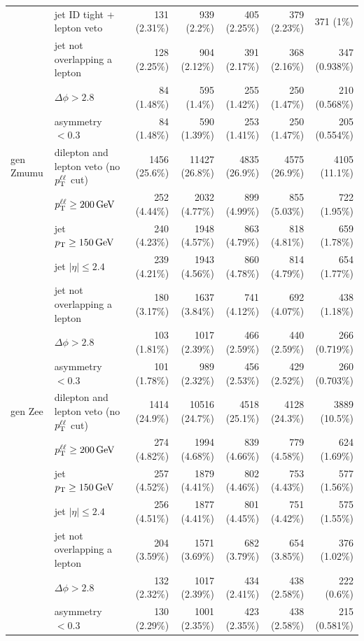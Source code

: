 \begin{tabular}{llrrrrr}
 & jet ID tight + lepton veto & 131 (2.31\%) & 939 (2.2\%) & 405 (2.25\%) & 379 (2.23\%) & 371 (1\%) \\
 & jet not overlapping a lepton & 128 (2.25\%) & 904 (2.12\%) & 391 (2.17\%) & 368 (2.16\%) & 347 (0.938\%) \\
 & $\Delta\phi > 2.8$ & 84 (1.48\%) & 595 (1.4\%) & 255 (1.42\%) & 250 (1.47\%) & 210 (0.568\%) \\
 & asymmetry $< 0.3$ & 84 (1.48\%) & 590 (1.39\%) & 253 (1.41\%) & 250 (1.47\%) & 205 (0.554\%) \\
\midrule
gen Zmumu & dilepton and lepton veto (no $p_{\mathrm{T}}^{\ell\ell}$ cut) & 1456 (25.6\%) & 11427 (26.8\%) & 4835 (26.9\%) & 4575 (26.9\%) & 4105 (11.1\%) \\
 & $p_{\mathrm{T}}^{\ell\ell} \geq 200\,\mathrm{GeV}$ & 252 (4.44\%) & 2032 (4.77\%) & 899 (4.99\%) & 855 (5.03\%) & 722 (1.95\%) \\
 & jet $p_{\mathrm{T}} \geq 150\,\mathrm{GeV}$ & 240 (4.23\%) & 1948 (4.57\%) & 863 (4.79\%) & 818 (4.81\%) & 659 (1.78\%) \\
 & jet $|\eta| \leq 2.4$ & 239 (4.21\%) & 1943 (4.56\%) & 860 (4.78\%) & 814 (4.79\%) & 654 (1.77\%) \\
 & jet not overlapping a lepton & 180 (3.17\%) & 1637 (3.84\%) & 741 (4.12\%) & 692 (4.07\%) & 438 (1.18\%) \\
 & $\Delta\phi > 2.8$ & 103 (1.81\%) & 1017 (2.39\%) & 466 (2.59\%) & 440 (2.59\%) & 266 (0.719\%) \\
 & asymmetry $< 0.3$ & 101 (1.78\%) & 989 (2.32\%) & 456 (2.53\%) & 429 (2.52\%) & 260 (0.703\%) \\
\midrule
gen Zee & dilepton and lepton veto (no $p_{\mathrm{T}}^{\ell\ell}$ cut) & 1414 (24.9\%) & 10516 (24.7\%) & 4518 (25.1\%) & 4128 (24.3\%) & 3889 (10.5\%) \\
 & $p_{\mathrm{T}}^{\ell\ell} \geq 200\,\mathrm{GeV}$ & 274 (4.82\%) & 1994 (4.68\%) & 839 (4.66\%) & 779 (4.58\%) & 624 (1.69\%) \\
 & jet $p_{\mathrm{T}} \geq 150\,\mathrm{GeV}$ & 257 (4.52\%) & 1879 (4.41\%) & 802 (4.46\%) & 753 (4.43\%) & 577 (1.56\%) \\
 & jet $|\eta| \leq 2.4$ & 256 (4.51\%) & 1877 (4.41\%) & 801 (4.45\%) & 751 (4.42\%) & 575 (1.55\%) \\
 & jet not overlapping a lepton & 204 (3.59\%) & 1571 (3.69\%) & 682 (3.79\%) & 654 (3.85\%) & 376 (1.02\%) \\
 & $\Delta\phi > 2.8$ & 132 (2.32\%) & 1017 (2.39\%) & 434 (2.41\%) & 438 (2.58\%) & 222 (0.6\%) \\
 & asymmetry $< 0.3$ & 130 (2.29\%) & 1001 (2.35\%) & 423 (2.35\%) & 438 (2.58\%) & 215 (0.581\%) \\

\end{tabular}
